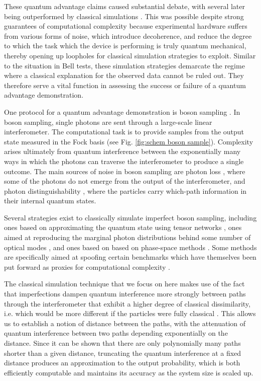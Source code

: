 \documentclass[10pt,aps,pra,twocolumn,superscriptaddress]{revtex4-2}
\begin{document}
These quantum advantage claims caused substantial debate, with several later being outperformed by classical simulations \cite{Pednault2019, PanZhang2021, Tindall2024, Oh2023_1, Sigbovik2024}. This was possible despite strong guarantees of computational complexity because experimental hardware suffers from various forms of noise, which introduce decoherence, and reduce the degree to which the task which the device is performing is truly quantum mechanical, thereby opening up loopholes for classical simulation strategies to exploit. Similar to the situation in Bell tests, these simulation strategies demarcate the regime where a classical explanation for the observed data cannot be ruled out. They therefore serve a vital function in assessing the success or failure of a quantum advantage demonstration.  

One protocol for a quantum advantage demonstration is boson sampling \cite{Aaronson_Arkhipov_BS}. In boson sampling, single photons are sent through a large-scale linear interferometer. The computational task is to provide samples from the output state measured in the Fock basis (see Fig. \ref{fig:schem boson sample}). Complexity arises ultimately from quantum interference between the exponentially many ways in which the photons can traverse the interferometer to produce a single outcome. The main sources of noise in boson sampling are photon loss \cite{brod2020classical}, where some of the photons do not emerge from the output of the interferometer, and photon distinguishability \cite{tichy2015sampling}, where the particles carry which-path information in their internal quantum states. 

Several strategies exist to classically simulate imperfect boson sampling, including ones based on approximating the quantum state using tensor networks \cite{Lubasch2018, Oh2023_1, Cilluffo2023, Liu2023}, ones aimed at reproducing the marginal photon distributions behind some number of optical modes \cite{Villalonga2021, Bulmer2022}, and ones based on based on phase-space methods \cite{rahimikeshari2016,  Qi2020, Drummond2021, Dellios2023}. Some methods are specifically aimed at spoofing certain benchmarks which have themselves been put forward as proxies for computational complexity \cite{Oh2023_3}. 

The classical simulation technique that we focus on here makes use of the fact that imperfections dampen quantum interference more strongly between paths through the interferometer that exhibit a higher degree of classical dissimilarity, i.e. which would be more different if the particles were fully classical \cite{renema2018efficient, renemaarxiv2018}. This allows us to establish a notion of distance between the paths, with the attenuation of quantum interference between two paths depending exponentially on the distance. Since it can be shown that there are only polynomially many paths shorter than a given distance, truncating the quantum interference at a fixed distance produces an approximation to the output probability, which is both efficiently computable and maintains its accuracy as the system size is scaled up. 
\end{document}
